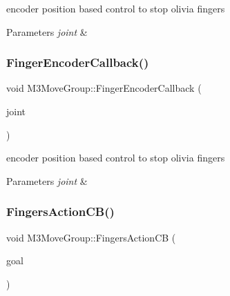 encoder position based control to stop olivia fingers 


\begin{DoxyParams}{Parameters}
{\em joint} & \\
\hline
\end{DoxyParams}
\mbox{\label{classM3MoveGroup_a7208ba7725391ea9ffd98d3d31ae5f0d}} 
\subsubsection{\texorpdfstring{Finger\+Encoder\+Callback()}{FingerEncoderCallback()}\hspace{0.1cm}{\footnotesize\ttfamily [2/2]}}
{\footnotesize\ttfamily void M3\+Move\+Group\+::\+Finger\+Encoder\+Callback (\begin{DoxyParamCaption}\item[{const kaist\+\_\+msgs\+::\+Joint\+Encoder\+Status\+Const\+Ptr \&}]{joint }\end{DoxyParamCaption})\hspace{0.3cm}{\ttfamily [inline]}}



encoder position based control to stop olivia fingers 


\begin{DoxyParams}{Parameters}
{\em joint} & \\
\hline
\end{DoxyParams}
\mbox{\label{classM3MoveGroup_a50f3c0ec424696c8d613cbfb18829384}} 
\subsubsection{\texorpdfstring{Fingers\+Action\+C\+B()}{FingersActionCB()}\hspace{0.1cm}{\footnotesize\ttfamily [1/2]}}
{\footnotesize\ttfamily void M3\+Move\+Group\+::\+Fingers\+Action\+CB (\begin{DoxyParamCaption}\item[{const m3\+\_\+moveit\+::\+Moveit\+Fingers\+Goal\+Const\+Ptr \&}]{goal }\end{DoxyParamCaption})\hspace{0.3cm}{\ttfamily [inline]}}



